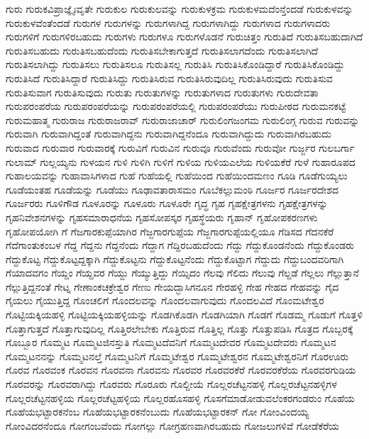 {ಗುರು
ಗುರುಕವಿಪ್ರಾಜ್ಞೈಃವೃತೇ
ಗುರುಕುಲ
ಗುರುಕುಲವನ್ನು
ಗುರುಕುಳಕ್ರಮ
ಗುರುಕುಳಮದೆಂನ್ತೆಂದಡೆ
ಗುರುಕುಳವನ್ನು
ಗುರುಕುಳವೆಂತೆಂದಡೆ
ಗುರುಗಳ
ಗುರುಗಳನ್ನು
ಗುರುಗಳಾಗಿದ್ದ
ಗುರುಗಳಾಗಿದ್ದು
ಗುರುಗಳಾದ
ಗುರುಗಳಾದರು
ಗುರುಗಳಿಗೆ
ಗುರುಗಳಿರಬಹುದು
ಗುರುಗಳು
ಗುರುಗಳೂ
ಗುರುಗಳೊಡನೆ
ಗುರುಚಿತ್ತಂ
ಗುರುತಿದೆ
ಗುರುತಿಸಬಹುದಾಗಿದೆ
ಗುರುತಿಸಬಹುದು
ಗುರುತಿಸಬಹುದೆಂದು
ಗುರುತಿಸಬೇಕಾಗುತ್ತದೆ
ಗುರುತಿಸಲಾಗದೆಂದು
ಗುರುತಿಸಲಾಗಿದೆ
ಗುರುತಿಸಲಾಗಿದ್ದು
ಗುರುತಿಸಲು
ಗುರುತಿಸಲೂ
ಗುರುತಿಸಲ್ಲ
ಗುರುತಿಸಿ
ಗುರುತಿಸಿಕೊಂಡಿದ್ದಾರೆ
ಗುರುತಿಸಿಕೊಂಡಿದ್ದು
ಗುರುತಿಸಿದೆ
ಗುರುತಿಸಿದ್ದಾರೆ
ಗುರುತಿಸಿದ್ದು
ಗುರುತಿಸಿರುವ
ಗುರುತಿಸಿರುವುದಿಲ್ಲ
ಗುರುತಿಸಿರುವುದು
ಗುರುತಿಸುವ
ಗುರುತಿಸುವಾಗ
ಗುರುತಿಸುವುದು
ಗುರುತು
ಗುರುತುಗಳನ್ನು
ಗುರುತುಗಳಾದ
ಗುರುತುಗಳು
ಗುರುದೇವತಾ
ಗುರುಪರಂಪರೆಯ
ಗುರುಪರಂಪರೆಯನ್ನು
ಗುರುಪರಂಪರೆಯಲ್ಲಿ
ಗುರುಪರಂಪರೆಯು
ಗುರುಪೀಠದ
ಗುರುಮನಕಟ್ಟೆ
ಗುರುಮಹಾತ್ಮ
ಗುರುರಾಜ
ಗುರುರಾಜರಾವ್
ಗುರುರಾಜಾಚಾರ್
ಗುರುಲಿಂಗಜಂಗಮ
ಗುರುಲಿಂಗ್ಗ
ಗುರುವ
ಗುರುವನ್ನು
ಗುರುವಾಗಿ
ಗುರುವಾಗಿದ್ದಂತೆ
ಗುರುವಾಗಿದ್ದನು
ಗುರುವಾಗಿದ್ದನೆಂದೂ
ಗುರುವಾಗಿದ್ದುದು
ಗುರುವಾಗಿರಬಹುದು
ಗುರುವಾದ
ಗುರುವಾರ
ಗುರುವಾರಕ್ಕೆ
ಗುರುವಿಗೆ
ಗುರುವಿನ
ಗುರುವೂ
ಗುರುವೆಂದು
ಗುರುವೋ
ಗುರ್ಜ್ಜರ
ಗುಲಬರ್ಗಾ
ಗುಲಾಮ್
ಗುಲ್ಲಯ್ಯನು
ಗುಳಯನ
ಗುಳಿ
ಗುಳಿಗಿ
ಗುಳಿಗೆ
ಗುಳಿಯ
ಗುಳಿಯಎಲೆಯ
ಗುಳಿಯಕೆರೆ
ಗುಳೆ
ಗುಹಾರೂಪದ
ಗುಹಾಲಯವನ್ನು
ಗುಹಾವಾಸಿಗಳಾದ
ಗುಹೆ
ಗುಹೆಯಲ್ಲಿ
ಗುಹೆಯಿಂದ
ಗುಹೆಯಿಂದಮಣಂ
ಗೂಡಿ
ಗೂಡೆಗುಯ್ಯಲು
ಗೂಡೆಯಂತಹ
ಗೂಡೆಯನ್ನು
ಗೂಡೆಯು
ಗೂಢಾವತಾರಾಸಮಂ
ಗೂಬೆಕಲ್ಲುಮಂಠಿ
ಗೂರ್ಜರ
ಗೂರ್ಜರದೇಶದ
ಗೂರ್ಜರರು
ಗೂಳಿಗೌಡ
ಗೂಳೂರನ್ನು
ಗೂಳೂರು
ಗೂಳೂರೇ
ಗೃದ್ಧ
ಗೃಹ
ಗೃಹಕ್ಷೇತ್ರಗಳನು
ಗೃಹಕ್ಷೇತ್ರಗಳನ್ನು
ಗೃಹನಿವೇಶನಗಳನ್ನು
ಗೃಹಸಮಾರಾಧನೆಯ
ಗೃಹಸೋಪಸ್ಕರ
ಗೃಹಸ್ಥೆಯರು
ಗೃಹಾನ್
ಗೃಹೋಪಕರಣಗಳು
ಗೃಹೋಪಯೋಗಿ
ಗೆ
ಗೆಜಗಾರಕುಪ್ಪೆಯಾಗಿರ
ಗೆಜ್ಜಗಾರಗುಪ್ಪೆಯ
ಗೆಜ್ಜಗಾರಗುಪ್ಪೆಯಲ್ಲಿಯೂ
ಗೆಡಿಸದ
ಗೆದನಕೆರೆ
ಗೆದೆಗಾಂತುಕಂಬಳ
ಗೆದ್ದ
ಗೆದ್ದನು
ಗೆದ್ದನೆಂದು
ಗೆದ್ದಾಗ
ಗೆದ್ದಿರಬಹುದೆಂದು
ಗೆದ್ದು
ಗೆದ್ದುಕೊಂಡನೆಂದು
ಗೆದ್ದುಕೊಂಡರು
ಗೆದ್ದುಕೊಟ್ಟ
ಗೆದ್ದುಕೊಟ್ಟದ್ದಕ್ಕಾಗಿ
ಗೆದ್ದುಕೊಟ್ಟನು
ಗೆದ್ದುಕೊಟ್ಟನೆಂದು
ಗೆದ್ದುಕೊಟ್ಟಾಗ
ಗೆದ್ದುದು
ಗೆದ್ದುಬಂದವರಿಗಾಗಿ
ಗೆಯಾದವಗಂ
ಗೆಯ್ದಂ
ಗೆಯ್ದವರ
ಗೆಯ್ದು
ಗೆಯ್ಯುತ್ತಿದ್ದು
ಗೆಯ್ಸಿದಂ
ಗೆಲವು
ಗೆಲಿದು
ಗೆಲುವು
ಗೆಲ್ದಡೆ
ಗೆಲ್ಲಲು
ಗೆಲ್ಲುತ್ತಾನೆ
ಗೆಲ್ಲುತ್ತಿದ್ದನಂತೆ
ಗೇಟ್ನ
ಗೇಣಾಂಕಚಕ್ರೇಶ್ವರ
ಗೇಣು
ಗೇಯದ್ಭಾಸಿಗನೂನ
ಗೇರಹಳ್ಳಿ
ಗೇಹ
ಗೇಹದ
ಗೇಹವನ್ನು
ಗೈದ
ಗೈಯಲು
ಗೈಯುತ್ತಿದ್ದ
ಗೊಂಚಲಿಗೆ
ಗೊಂದಲವನ್ನು
ಗೊಂದಲವಾಗುವುದು
ಗೊಂದಲವಿದೆ
ಗೊಂಮಟೇಶ್ವರ
ಗೊಟ್ಟಿಯಕ್ಕಿಯಹಳ್ಳಿ
ಗೊಟ್ಟಿಯಕ್ಕಿಯಹಳ್ಳಿಯನ್ನು
ಗೊಡಗಿಕೊಡಗಿ
ಗೊಡಗಿಯಾಗಿ
ಗೊಡಗೆ
ಗೊಡಮ್ಮ
ಗೊಡುಗೆ
ಗೊತ್ತಳಿ
ಗೊತ್ತಾಗುತ್ತದೆ
ಗೊತ್ತಾಗುವುದಿಲ್ಲ
ಗೊತ್ತಿರಲೇಬೇಕು
ಗೊತ್ತಿರುವ
ಗೊತ್ತಿಲ್ಲ
ಗೊತ್ತು
ಗೊತ್ತುಪಡಿಸಿ
ಗೊತ್ರದ
ಗೊಬ್ಬರಕ್ಕೆ
ಗೊಬ್ಬೂರ
ಗೊಮ್ಮಟ
ಗೊಮ್ಮಟಜಿನಸ್ತುತಿ
ಗೊಮ್ಮಟದೆವನಿಗೆ
ಗೊಮ್ಮಟದೇವರ
ಗೊಮ್ಮಟದೇವರು
ಗೊಮ್ಮಟನ
ಗೊಮ್ಮಟನನನ್ನು
ಗೊಮ್ಮಟನಲ್ತೆ
ಗೊಮ್ಮಟನಿಗೆ
ಗೊಮ್ಮಟೇಶ್ವರ
ಗೊಮ್ಮಟೇಶ್ವರನ
ಗೊಮ್ಮಟೇಶ್ವರನಿಗೆ
ಗೊರಊರು
ಗೊರವ
ಗೊರವಂಕ
ಗೊರವನ
ಗೊರವನಾ
ಗೊರವನು
ಗೊರವರ
ಗೊರವರಕೆರೆ
ಗೊರವರಕೆರೆಯ
ಗೊರವರಗುಡಿಯ
ಗೊರವರನ್ನು
ಗೊರವರಾಗಿದ್ದು
ಗೊರವರು
ಗೊರೂರು
ಗೊಲ್ದೀಯೆ
ಗೊಲ್ಲರಚೆಟ್ಟನಹಳ್ಳಿ
ಗೊಲ್ಲರಚೆಟ್ಟನಹಳ್ಳಿಗಳ
ಗೊಲ್ಲರಚೆಟ್ಟನಹಳ್ಳಿಯ
ಗೊಲ್ಲರಚೆಟ್ಟಹಳ್ಳಿಯ
ಗೊಲ್ಲರಹೊಸಹಳ್ಳಿ
ಗೊಸಗೆಮಾಡೋಡುವಲೆಂಕರಗಂಡರುಂ
ಗೊಹೆಯ
ಗೊಹೆಯಭಟ್ಟಾರಕನೆಂಬ
ಗೊಹೆಯಭಟ್ಟಾರಕನೆಂಬುದು
ಗೊಹೆಯಭಟ್ಟಾರಕನ್
ಗೋ
ಗೋಂವಿಂದಯ್ಯ
ಗೋಂವಿದರನೆಂದೂ
ಗೋಗಂಬವೆಂದು
ಗೋಗಲ್ಲು
ಗೋಗ್ರಹಣವಾಗಿರಬಹುದು
ಗೋಜಲುಗಳಿವೆ
ಗೋಡೆಕೆರೆಯ
}

